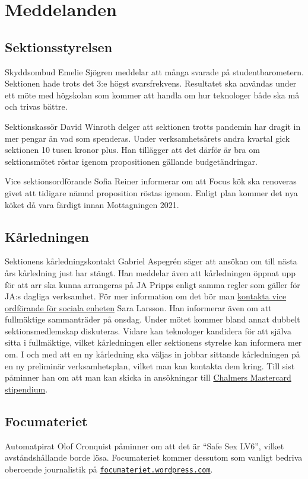 \documentclass[hidelinks]{sektionsmote}
\begin{document}
\section{Meddelanden}
\subsection{Sektionsstyrelsen}
Skyddsombud Emelie Sjögren meddelar att många svarade på studentbarometern.
Sektionen hade trots det 3:e högst svarsfrekvens.%
Resultatet ska användas under ett möte med högskolan som kommer att handla om hur teknologer både ska må och trivas bättre.

Sektionskassör David Winroth delger att sektionen trotts pandemin har dragit in mer pengar än vad som spenderas.
Under verksamhetsårets andra kvartal gick sektionen 10 tusen kronor plus.
Han tillägger att det därför är bra om sektionsmötet röstar igenom propositionen gällande budgetändringar.

Vice sektionsordförande Sofia Reiner informerar om att Focus kök ska renoveras givet att tidigare nämnd proposition röstas igenom.
Enligt plan kommer det nya köket då vara färdigt innan Mottagningen 2021.

\subsection{Kårledningen}
Sektionens kårledningskontakt Gabriel Aspegrén säger att ansökan om till nästa års kårledning just har stängt.
Han meddelar även att kårledningen öppnat upp för att arr ska kunna arrangeras på JA Pripps enligt samma regler som gäller för JA:s dagliga verksamhet.
För mer information om det bör man \href{mailto:vso@chalmersstudentkar.se}{kontakta vice ordförande för sociala enheten} Sara Larsson.
Han informerar även om att fullmäktige sammanträder på onsdag.
Under mötet kommer bland annat dubbelt sektionsmedlemskap diskuteras.
Vidare kan teknologer kandidera för att själva sitta i fullmäktige, vilket kårledningen eller sektionens styrelse kan informera mer om.
I och med att en ny kårledning ska väljas in jobbar sittande kårledningen på en ny preliminär verksamhetsplan, vilket man kan kontakta dem kring.
Till sist påminner han om att man kan skicka in ansökningar till \href{https://www.chalmers.se/sv/samverkan/alumn/alumnerbjudanden/chalmers%20mastercard/stipendium/Sidor/default.aspx}{Chalmers Mastercard stipendium}.

\subsection{Focumateriet}
Automatpirat Olof Cronquist påminner om att det är \enquote{Safe Sex LV6}, vilket avståndshållande borde lösa.
Focumateriet kommer dessutom som vanligt bedriva oberoende journalistik på \newline\href{https://focumateriet.wordpress.com}{\texttt{focumateriet.wordpress.com}}.
\end{document}
